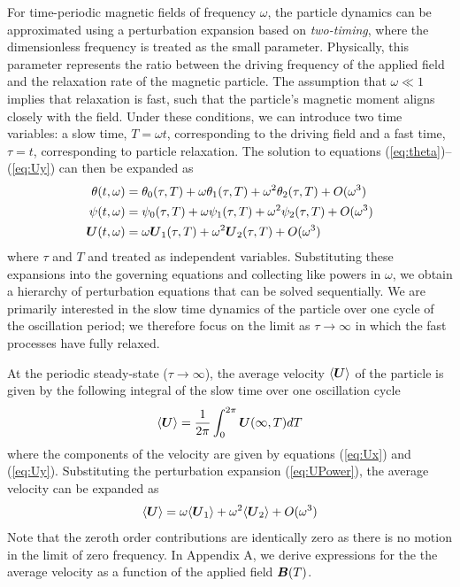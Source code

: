 For time-periodic magnetic fields of frequency $\omega$, the particle dynamics can be approximated using a perturbation expansion based on \emph{two-timing},\cite{Strogatz2015} where the dimensionless frequency is treated as the small parameter. Physically, this parameter represents the ratio between the driving frequency of the applied field and the relaxation rate of the magnetic particle. The assumption that $\omega\ll 1$ implies that relaxation is fast, such that the particle's magnetic moment aligns closely with the field. Under these conditions, we can introduce two time variables: a slow time, $T=\omega t$, corresponding to the driving field and a fast time, $\tau=t$, corresponding to particle relaxation. The solution to equations (\ref{eq:theta})--(\ref{eq:Uy}) can then be expanded as
\begin{align}
    \theta(t,\omega) &= \theta_0(\tau,T) + \omega \theta_1(\tau,T) + \omega^2 \theta_2(\tau,T) + O(\omega^3) \label{eq:thetaPower}
    \\
    \psi(t,\omega) &= \psi_0(\tau,T) + \omega \psi_1(\tau,T) + \omega^2 \psi_2(\tau,T) + O(\omega^3) \label{eq:psiPower}
    \\
    \boldsymbol{U}(t,\omega) &= \omega \boldsymbol{U}_1(\tau,T) + \omega^2 \boldsymbol{U}_2(\tau,T) + O(\omega^3) \label{eq:UPower}
\end{align}
where $\tau$ and $T$ and treated as independent variables. Substituting these expansions into the governing equations and collecting like powers in $\omega$, we obtain a hierarchy of perturbation equations that can be solved sequentially. We are primarily interested in the slow time dynamics of the particle over one cycle of the oscillation period; we therefore focus on the limit as $\tau\rightarrow\infty$ in which the fast processes have fully relaxed.

At the periodic steady-state ($\tau\rightarrow\infty$), the average velocity $\langle\boldsymbol{U}\rangle$ of the particle is given by the following integral of the slow time over one oscillation cycle
\begin{equation}
    \langle\boldsymbol{U}\rangle = \frac{1}{2\pi} \int_0^{2\pi} \boldsymbol{U}(\infty, T) dT
\end{equation}
where the components of the velocity are given by equations (\ref{eq:Ux}) and (\ref{eq:Uy}).  Substituting the perturbation expansion (\ref{eq:UPower}), the average velocity can be expanded as
\begin{equation}
    \langle\boldsymbol{U}\rangle = \omega \langle\boldsymbol{U}_1\rangle + \omega^2 \langle\boldsymbol{U}_2\rangle + O(\omega^3) \label{eq:averageU}
\end{equation}
Note that the zeroth order contributions are identically zero as there is no motion in the limit of zero frequency. In Appendix A, we derive expressions for the the average velocity as a function of the applied field $\boldsymbol{B}(T)$.

